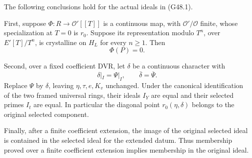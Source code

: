 \begin{lemma}
\label{AC-G48}
The following conclusions hold for the actual ideals in (G48.1).

First, suppose $\Phi:R\to\mathcal O'[[T]]$ is a continuous
map, with $\mathcal O'/\mathcal O$ finite, whose specialization
at $T=0$ is $r_0$.  Suppose its representation modulo $T^n$,
over $E'[T]/T^n$, is crystalline on $H_L$ for every $n\ge1$.
Then
\[
                         \Phi(P)=0.                    \tag{G48.2}
\]

Second, over a fixed coefficient DVR, let $\delta$ be a
continuous character with
\[
 \delta|_I=\Psi|_I,\qquad \overline\delta=\overline\Psi.
                                                        \tag{G48.3}
\]
Replace $\Psi$ by $\delta$, leaving $\eta,\tau,e,K_v$
unchanged.  Under the canonical identification of the two
framed universal rings, their ideals $I_Y$ are equal and
their selected primes $I_t$ are equal.  In particular the
diagonal point $r_0(\eta,\delta)$ belongs to the original
selected component.

Finally, after a finite coefficient extension, the image of
the original selected ideal is contained in the selected
ideal for the extended datum.  Thus membership proved over
a finite coefficient extension implies membership in the
original ideal.
\end{lemma}
